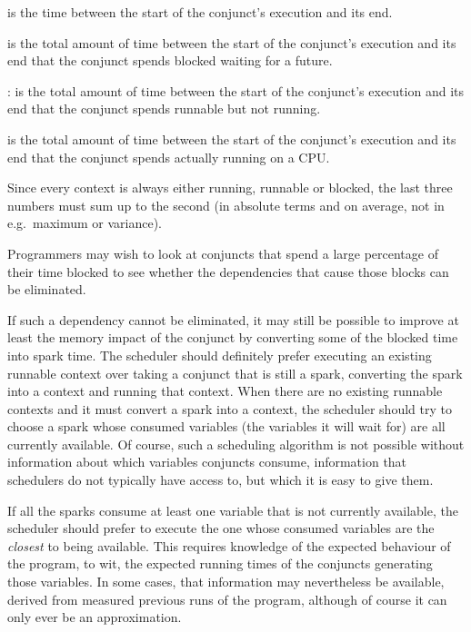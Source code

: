 is the time between the start of the conjunct's execution and its end.

is the total amount of time
between the start of the conjunct's execution and its end
that the conjunct spends blocked waiting for a future.


:
is the total amount of time
between the start of the conjunct's execution and its end
that the conjunct spends runnable but not running.

is the total amount of time
between the start of the conjunct's execution and its end
that the conjunct spends actually running on a CPU.

Since every context is always either running, runnable or blocked,
the last three numbers must sum up to the second
(in absolute terms and on average, not in e.g.\ maximum or variance).

Programmers may wish to look at conjuncts
that spend a large percentage of their time blocked
to see whether the dependencies that cause those blocks can be eliminated.

If such a dependency cannot be eliminated,
it may still be possible to improve
at least the memory impact of the conjunct
by converting some of the blocked time into spark time.
The scheduler should definitely prefer executing an existing runnable context
over taking a conjunct that is still a spark,
converting the spark into a context and running that context.
When there are no existing runnable contexts
and it must convert a spark into a context,
the scheduler should try to choose a spark whose consumed variables
(the variables it will wait for) are all currently available.
Of course, such a scheduling algorithm is not possible
without information about which variables conjuncts consume,
information that schedulers do not typically have access to,
but which it is easy to give them.

If all the sparks consume at least one variable
that is not currently available,
the scheduler should prefer to execute the one
whose consumed variables are the \emph{closest} to being available.
This requires knowledge of the expected behaviour of the program,
to wit, the expected running times of the conjuncts generating those variables.
In some cases, that information may nevertheless be available,
derived from measured previous runs of the program,
although of course it can only ever be an approximation.

